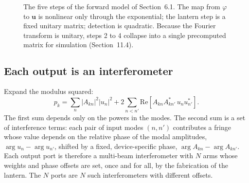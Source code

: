 \documentclass[11pt,a4paper]{article}
\newcommand{\uvec}{\mathbf{u}}
\newcommand{\vvec}{\mathbf{v}}
\newcommand{\braket}[2]{\langle #1|#2\rangle}
\begin{document}
\begin{figure}[t]
\centering
{}
\caption{The five steps of the forward model of Section~6.1. The map from $\varphi$ to $\uvec$ is nonlinear only through the exponential; the lantern step is a fixed unitary matrix; detection is quadratic. Because the Fourier transform is unitary, steps 2 to 4 collapse into a single precomputed matrix for simulation (Section~11.4).}
\label{fig:chain}
\end{figure}

\subsection{Each output is an interferometer}
Expand the modulus squared:
\begin{equation}
p_k = \sum_n |A_{kn}|^2 |u_n|^2 + 2\sum_{n<n'} \mathrm{Re}\!\left[ A_{kn} A_{kn'}^*\, u_n u_{n'}^* \right].
\label{eq:interferometer}
\end{equation}
The first sum depends only on the powers in the modes. The second sum is a set of interference terms: each pair of input modes $(n,n')$ contributes a fringe whose value depends on the relative phase of the modal amplitudes, $\arg u_n - \arg u_{n'}$, shifted by a fixed, device-specific phase, $\arg A_{kn} - \arg A_{kn'}$. Each output port is therefore a multi-beam interferometer with $N$ arms whose weights and phase offsets are set, once and for all, by the fabrication of the lantern. The $N$ ports are $N$ such interferometers with different offsets.
\end{document}
